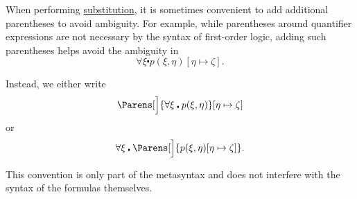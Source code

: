\begin{remark}\label{rem:first_order_substitution_parentheses}
  When performing \hyperref[def:propositional_substitution]{substitution}, it is sometimes convenient to add additional parentheses to avoid ambiguity. For example, while parentheses around quantifier expressions are not necessary by the syntax of first-order logic, adding such parentheses helps avoid the ambiguity in
  \begin{equation*}
    \forall \xi \centerdot p(\xi, \eta) [\eta \mapsto \zeta].
  \end{equation*}

  Instead, we either write
  \begin{equation*}
    \Parens[\Big]{ \forall \xi \centerdot p(\xi, \eta) } [\eta \mapsto \zeta]
  \end{equation*}
  or
  \begin{equation*}
    \forall \xi \centerdot \Parens[\Big]{ p(\xi, \eta)[\eta \mapsto \zeta] }.
  \end{equation*}

  This convention is only part of the metasyntax and does not interfere with the syntax of the formulas themselves.
\end{remark}


